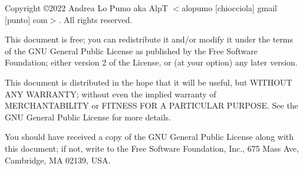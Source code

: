 \pagebreak
\begin{small}
Copyright \copyright 2022 Andrea Lo Pumo aka AlpT $<$alopumo [chiocciola] gmail [punto] com$>$. All rights reserved.

  This document is free; you can redistribute it and/or modify it
  under the terms of the GNU General Public License as published by
  the Free Software Foundation; either version 2 of the License, or
  (at your option) any later version.

  This document is distributed in the hope that it will be useful, but
  WITHOUT ANY WARRANTY; without even the implied warranty of
  MERCHANTABILITY or FITNESS FOR A PARTICULAR PURPOSE\@.  See the GNU
  General Public License for more details.

  You should have received a copy of the GNU General Public License
  along with this document; if not, write to the Free Software
  Foundation, Inc., 675 Mass Ave, Cambridge, MA 02139, USA.
\end{small}

